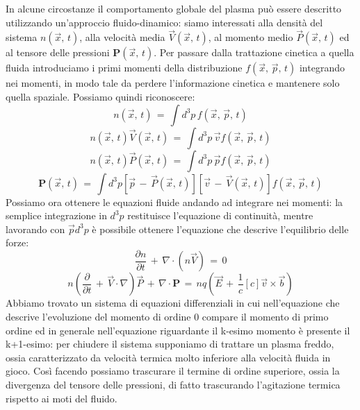 In alcune circostanze il comportamento globale del plasma può essere descritto utilizzando un'approccio fluido-dinamico: 
siamo interessati alla densità del sistema $n\left(\vec{x},\,t\right)$, alla velocità media $\vec{V}\left(\vec{x},\,t\right)$,
al momento medio $\vec{P}\left(\vec{x},\,t\right)$ ed al tensore delle pressioni $\mathbf{P}\left(\vec{x},\,t\right)$. Per 
passare dalla trattazione cinetica a quella fluida introduciamo i primi momenti della distribuzione $f\left(\vec{x},\,\vec{p},\,t\right)$ 
integrando nei momenti, in modo tale da perdere l'informazione cinetica e mantenere solo quella spaziale. Possiamo quindi 
riconoscere:
\begin{equation}
    n\left(\vec{x},\,t\right)\,=\,\int d^3p \,f\left(\vec{x},\,\vec{p},\,t\right)
    \label{equation: numb_density}
\end{equation}
\begin{equation}
    n\left(\vec{x},\,t\right)\vec{V}\left(\vec{x},\,t\right)\,=\,\int d^3p\,\vec{v} f\left(\vec{x},\,\vec{p},\,t\right)
    \label{equation: mean_velocity}
\end{equation}
\begin{equation}
    n\left(\vec{x},\,t\right)\vec{P}\left(\vec{x},\,t\right)\,=\,\int d^3p\,\vec{p} f\left(\vec{x},\,\vec{p},\,t\right)
    \label{equation: p_tens}
\end{equation}
\begin{equation}
    \mathbf{P}\left(\vec{x},\,t\right)\,=\,\int d^3p\left[\vec{p}\,-\,\vec{P}\left(\vec{x},\,t\right)\right]\left[\vec{v}\,-\,\vec{V}\left(\vec{x},\,t\right)\right] f\left(\vec{x},\,\vec{p},\,t\right)
    \label{equation: p_tens1}
\end{equation}
Possiamo ora ottenere le equazioni fluide andando ad integrare nei momenti: la semplice integrazione in $d^3p$ restituisce 
l'equazione di continuità, mentre lavorando con $\vec{p}d^3p$ è possibile ottenere l'equazione che descrive l'equilibrio delle
forze:
\begin{equation}
    \frac{\partial n}{\partial t}\,+\,\nabla \cdot \left(n\vec{V}\right)\,=\,0
    \label{equation: continuity_eq}
\end{equation}
\begin{equation}
    n\left(\frac{\partial}{\partial t}\,+\,\vec{V}\cdot \nabla\right)\vec{P}\,+\,\nabla \cdot \mathbf{P}\,=\,nq\left(\vec{E}\,+\,\frac{1}{c}\left[c\right]\vec{v} \times \vec{b}\right)
    \label{equation: force_balance}
\end{equation}
Abbiamo trovato un sistema di equazioni differenziali in cui nell'equazione che descrive l'evoluzione del momento di ordine 0 
compare il momento di primo ordine ed in generale nell'equazione riguardante il k-esimo momento è presente il k+1-esimo: per 
chiudere il sistema supponiamo di trattare un plasma freddo, ossia caratterizzato da velocità termica molto inferiore alla 
velocità fluida in gioco. Così facendo possiamo trascurare il termine di ordine superiore, ossia la divergenza del tensore delle 
pressioni, di fatto trascurando l'agitazione termica rispetto ai moti del fluido.

